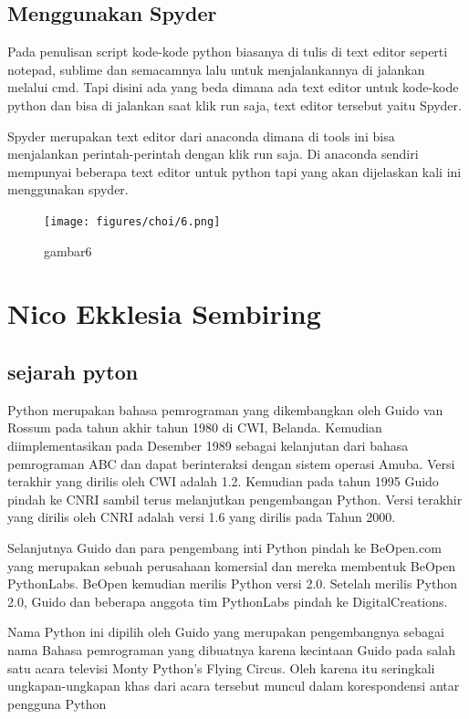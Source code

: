 \subsection{Menggunakan Spyder}
Pada penulisan script kode-kode python biasanya di tulis di text editor seperti notepad, sublime dan semacamnya lalu untuk menjalankannya di jalankan melalui cmd. Tapi disini ada yang beda dimana ada text editor untuk kode-kode python dan bisa di jalankan saat klik run saja, text editor tersebut yaitu Spyder.
\par Spyder merupakan text editor dari anaconda dimana di tools ini bisa menjalankan perintah-perintah dengan klik run saja. Di anaconda sendiri mempunyai beberapa text editor untuk python tapi yang akan dijelaskan kali ini menggunakan spyder.
\begin{figure}[!htbp]
    \centering
    \texttt{[image: figures/choi/6.png]}
    \caption{gambar6}
    \label{spyder}
    \end{figure}
	



\section{Nico Ekklesia Sembiring}
\subsection{sejarah pyton}
Python merupakan bahasa pemrograman yang dikembangkan oleh Guido van Rossum pada tahun akhir tahun 1980 di CWI, Belanda. Kemudian diimplementasikan pada Desember 1989 sebagai kelanjutan dari bahasa pemrograman ABC dan dapat berinteraksi dengan sistem operasi Amuba. Versi terakhir yang dirilis oleh CWI adalah 1.2. Kemudian pada tahun 1995 Guido pindah ke CNRI sambil terus melanjutkan pengembangan Python. Versi terakhir yang dirilis oleh CNRI adalah versi 1.6 yang dirilis pada Tahun 2000.

Selanjutnya Guido dan para pengembang inti Python pindah ke BeOpen.com yang merupakan sebuah perusahaan komersial dan mereka membentuk BeOpen PythonLabs. BeOpen kemudian merilis Python versi 2.0. Setelah merilis Python 2.0, Guido dan beberapa anggota tim PythonLabs pindah ke DigitalCreations.

Nama Python ini dipilih oleh Guido yang merupakan pengembangnya sebagai nama Bahasa pemrograman yang dibuatnya karena kecintaan Guido pada salah satu acara televisi Monty Python’s Flying Circus. Oleh karena itu seringkali ungkapan-ungkapan khas dari acara tersebut muncul dalam korespondensi antar pengguna Python


